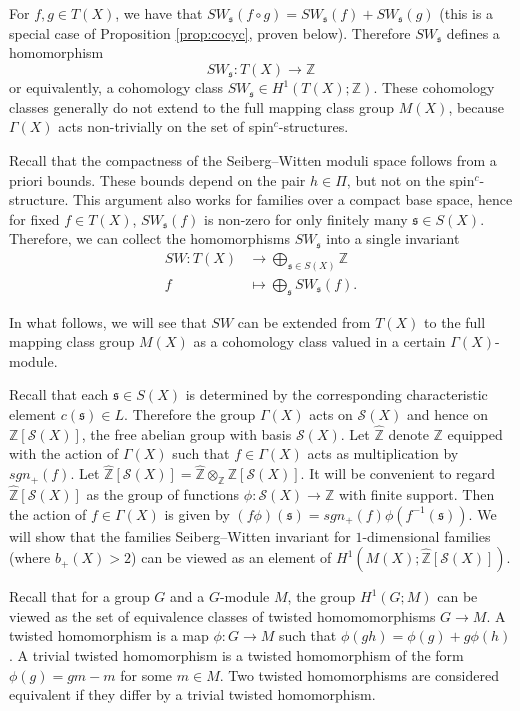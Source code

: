 \documentclass{amsart}
\theoremstyle{definition}
\theoremstyle{remark}
\numberwithin{equation}{section}
\begin{document}
For $f,g \in T(X)$, we have that $SW_{\mathfrak{s}}(f \circ g ) = SW_{\mathfrak{s}}(f) + SW_{\mathfrak{s}}(g)$ (this is a special case of Proposition \ref{prop:cocyc}, proven below). Therefore $SW_{\mathfrak{s}}$ defines a homomorphism
\[
SW_{\mathfrak{s}} : T(X) \to \mathbb{Z}
\]
or equivalently, a cohomology class $SW_{\mathfrak{s}} \in H^1( T(X) ; \mathbb{Z})$. These cohomology classes generally do not extend to the full mapping class group $M(X)$, because $\Gamma(X)$ acts non-trivially on the set of spin$^c$-structures. 


Recall that the compactness of the Seiberg--Witten moduli space follows from a priori bounds. These bounds depend on the pair $h \in \Pi$, but not on the spin$^c$-structure. This argument also works for families over a compact base space, hence for fixed $f \in T(X)$, $SW_{\mathfrak{s}}(f)$ is non-zero for only finitely many $\mathfrak{s} \in S(X)$. Therefore, we can collect the homomorphisms $SW_{\mathfrak{s}}$ into a single invariant
\begin{align*}
SW : T(X) &\to \bigoplus_{\mathfrak{s} \in S(X)} \mathbb{Z} \\ f &\mapsto \bigoplus_{\mathfrak{s}} SW_{\mathfrak{s}}(f).
\end{align*}

In what follows, we will see that $SW$ can be extended from $T(X)$ to the full mapping class group $M(X)$ as a cohomology class valued in a certain $\Gamma(X)$-module.

Recall that each $\mathfrak{s} \in S(X)$ is determined by the corresponding characteristic element $c(\mathfrak{s}) \in L$. Therefore the group $\Gamma(X)$ acts on $\mathcal{S}(X)$ and hence on $\mathbb{Z}[\mathcal{S}(X)]$, the free abelian group with basis $\mathcal{S}(X)$. Let $\widehat{\mathbb{Z}}$ denote $\mathbb{Z}$ equipped with the action of $\Gamma(X)$ such that $f \in \Gamma(X)$ acts as multiplication by $sgn_+(f)$. Let $\widehat{\mathbb{Z}}[\mathcal{S}(X)] = \widehat{\mathbb{Z}} \otimes_{\mathbb{Z}} \mathbb{Z}[\mathcal{S}(X)]$. It will be convenient to regard $\widehat{\mathbb{Z}}[\mathcal{S}(X)]$ as the group of functions $\phi : \mathcal{S}(X) \to \mathbb{Z}$ with finite support. Then the action of $f \in \Gamma(X)$ is given by $(f\phi)(\mathfrak{s}) = sgn_+(f) \phi( f^{-1}(\mathfrak{s}))$. We will show that the families Seiberg--Witten invariant for $1$-dimensional families (where $b_+(X) > 2$) can be viewed as an element of $H^1( M(X) ; \widehat{\mathbb{Z}}[\mathcal{S}(X)])$. 

Recall that for a group $G$ and a $G$-module $M$, the group $H^1( G ; M )$ can be viewed as the set of equivalence classes of twisted homomomorphisms $G \to M$. A twisted homomorphism is a map $\phi : G \to M$ such that $\phi(gh) = \phi(g) + g \phi(h)$. A trivial twisted homomorphism is a twisted homomorphism of the form $\phi(g) = gm - m$ for some $m \in M$. Two twisted homomorphisms are considered equivalent if they differ by a trivial twisted homomorphism.
\end{document}
